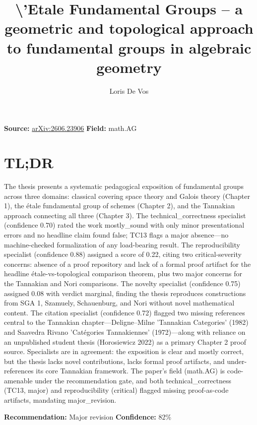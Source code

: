 \documentclass[11pt]{article}
\title{\textbackslash{}'Etale Fundamental Groups -- a geometric and topological approach to fundamental groups in algebraic geometry}
\author{Loris De Vos}
\date{}
\begin{document}
\maketitle

\noindent\textbf{Source:} \href{https://arxiv.org/abs/2606.23906}{arXiv:2606.23906} \quad \textbf{Field:} math.AG\\

\section*{TL;DR}
The thesis presents a systematic pedagogical exposition of fundamental groups across three domains: classical covering space theory and Galois theory (Chapter 1), the étale fundamental group of schemes (Chapter 2), and the Tannakian approach connecting all three (Chapter 3). The technical\_correctness specialist (confidence 0.70) rated the work mostly\_sound with only minor presentational errors and no headline claim found false; TC13 flags a major absence---no machine-checked formalization of any load-bearing result. The reproducibility specialist (confidence 0.88) assigned a score of 0.22, citing two critical-severity concerns: absence of a proof repository and lack of a formal proof artifact for the headline étale-vs-topological comparison theorem, plus two major concerns for the Tannakian and Nori comparisons. The novelty specialist (confidence 0.75) assigned 0.08 with verdict marginal, finding the thesis reproduces constructions from SGA 1, Szamuely, Schauenburg, and Nori without novel mathematical content. The citation specialist (confidence 0.72) flagged two missing references central to the Tannakian chapter---Deligne--Milne 'Tannakian Categories' (1982) and Saavedra Rivano 'Catégories Tannakiennes' (1972)---along with reliance on an unpublished student thesis (Horosiewicz 2022) as a primary Chapter 2 proof source. Specialists are in agreement: the exposition is clear and mostly correct, but the thesis lacks novel contributions, lacks formal proof artifacts, and under-references its core Tannakian framework. The paper's field (math.AG) is code-amenable under the recommendation gate, and both technical\_correctness (TC13, major) and reproducibility (critical) flagged missing proof-as-code artifacts, mandating major\_revision.

\textbf{Recommendation:} Major revision \quad \textbf{Confidence:} 82\%\\
\end{document}
